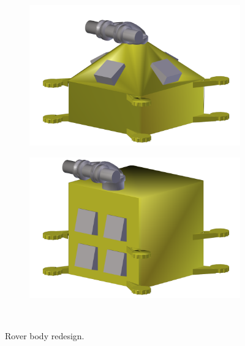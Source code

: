 \begin{figure}[h]
\captionsetup[subfigure]{justification=centering}
\vspace{-2ex}
	\centering
    \setlength{\subfigureWidth}{0.50\textwidth}
    \setlength{\graphicsHeight}{48mm}
    \hypersetup{hidelinks=true}%
    \begin{subfigure}[t]{\subfigureWidth}
        \centering
        \includegraphics[height=\graphicsHeight]{sections/design/solar-array/images/body-before.png}
		\label{fig:sub:rover-body-redesign-before}
    \end{subfigure}\hfill
    \begin{subfigure}[t]{\subfigureWidth}
        \centering
        \includegraphics[height=\graphicsHeight]{sections/design/solar-array/images/body-after.png}
		\label{fig:sub:rover-body-redesign-after}
	\end{subfigure}\\[0.8ex]
    \caption[Rover body redesign]
            {Rover body redesign.}
    \label{fig:rover-body-redesign}
\vspace{-2ex}
\end{figure}

